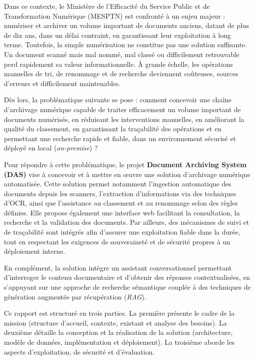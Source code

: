 \documentclass[12pt,a4paper]{report}
\newcommand{\nomMinistere}{Ministère de l'Efficacité du Service Public et de Transformation Numérique (MESPTN)}
\begin{document}
Dans ce contexte, le \nomMinistere{} est confronté à un enjeu majeur : numériser et archiver un volume important de documents anciens, datant de plus de dix ans, dans un délai contraint, en garantissant leur exploitation à long terme. Toutefois, la simple numérisation ne constitue pas une solution suffisante. Un document scanné mais mal nommé, mal classé ou difficilement retrouvable perd rapidement sa valeur informationnelle. À grande échelle, les opérations manuelles de tri, de renommage et de recherche deviennent coûteuses, sources d’erreurs et difficilement maintenables.

Dès lors, la problématique suivante se pose : comment concevoir une chaîne d’archivage numérique capable de traiter efficacement un volume important de documents numérisés, en réduisant les interventions manuelles, en améliorant la qualité du classement, en garantissant la traçabilité des opérations et en permettant une recherche rapide et fiable, dans un environnement sécurisé et déployé en local (\textit{on-premise}) ?

Pour répondre à cette problématique, le projet \textbf{Document Archiving System (DAS)} vise à concevoir et à mettre en œuvre une solution d’archivage numérique automatisée. Cette solution permet notamment l’ingestion automatique des documents depuis les scanners, l’extraction d’informations via des techniques d’OCR, ainsi que l’assistance au classement et au renommage selon des règles définies. Elle propose également une interface web facilitant la consultation, la recherche et la validation des documents. Par ailleurs, des mécanismes de suivi et de traçabilité sont intégrés afin d’assurer une exploitation fiable dans la durée, tout en respectant les exigences de souveraineté et de sécurité propres à un déploiement interne.

En complément, la solution intègre un assistant conversationnel permettant d’interroger le contenu documentaire et d’obtenir des réponses contextualisées, en s’appuyant sur une approche de recherche sémantique couplée à des techniques de génération augmentée par récupération (\textit{RAG}).

Ce rapport est structuré en trois parties. La première présente le cadre de la mission (structure d’accueil, contexte, existant et analyse des besoins). La deuxième détaille la conception et la réalisation de la solution (architecture, modèle de données, implémentation et déploiement). La troisième aborde les aspects d’exploitation, de sécurité et d’évaluation.
\end{document}
